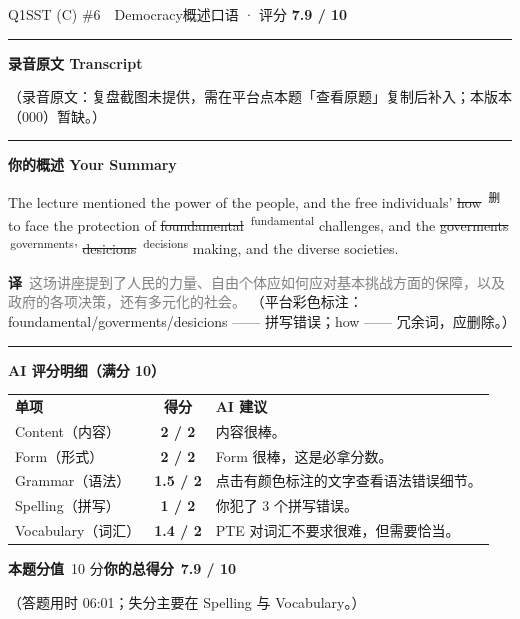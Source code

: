 \documentclass[11pt]{article}
\newcommand{\fix}[2]{%
  \colorbox{cWrongBg}{\textcolor{cWrong}{\sout{#1}}}%
  \,\textsuperscript{\textcolor{cFix}{\footnotesize #2}}}
\newcommand{\del}[1]{%
  \colorbox{cDelBg}{\textcolor{cDelete}{\sout{#1}}}%
  \,\textsuperscript{\textcolor{cDelete}{\footnotesize 删}}}
\newcommand{\sfull}[1]{\textcolor{cFix}{\bfseries #1}}     %
\newcommand{\spart}[1]{\textcolor{cPartial}{\bfseries #1}} %
\newcommand{\ptesub}[1]{%
  \par\needspace{2\baselineskip}\smallskip
  {\color{cAccent}\rule[-0.2ex]{3pt}{1.05em}}\hspace{6pt}%
  {\bfseries\color{cHead}#1}\par\nopagebreak\smallskip}
\newcommand{\zh}[1]{{\footnotesize\textcolor{cNote}{\textbf{译}}\ \textcolor{gray}{#1}}}
\begin{document}
\begin{qblock}{Q1\quad SST (C) \#6\ \ Democracy}{概述口语 · 评分 \textcolor{cAccent}{\bfseries 7.9 / 10}}
\ptesub{录音原文 Transcript}
\begin{promptbox}
{\color{cWrong}（录音原文：复盘截图未提供，需在平台点本题「查看原题」复制后补入；本版本（000）暂缺。）}
\end{promptbox}
\ptesub{你的概述 Your Summary}
\begin{youbox}
The lecture mentioned the power of the people, and the free individuals' \del{how} to face the protection of \fix{foundamental}{fundamental} challenges, and the \fix{goverments}{governments}' \fix{desicions}{decisions} making, and the diverse societies.
\end{youbox}
\zh{这场讲座提到了人民的力量、自由个体应如何应对基本挑战方面的保障，以及政府的各项决策，还有多元化的社会。}
{\footnotesize\color{gray}（平台彩色标注：foundamental/goverments/desicions —— 拼写错误；how —— 冗余词，应删除。）}
\ptesub{AI 评分明细（满分 10）}
\begin{notebox}
{\renewcommand{\arraystretch}{1.35}
\begin{tabularx}{\linewidth}{@{}l c Z@{}}
\textbf{单项} & \textbf{得分} & \textbf{AI 建议}\\[2pt]
Content（内容）& \sfull{2 / 2} & 内容很棒。\\
Form（形式）& \sfull{2 / 2} & Form 很棒，这是必拿分数。\\
Grammar（语法）& \spart{1.5 / 2} & 点击有颜色标注的文字查看语法错误细节。\\
Spelling（拼写）& \spart{1 / 2} & 你犯了 3 个拼写错误。\\
Vocabulary（词汇）& \spart{1.4 / 2} & PTE 对词汇不要求很难，但需要恰当。\\
\end{tabularx}}
\smallskip
\textbf{本题分值}\ 10 分\qquad\textbf{你的总得分}\ \textcolor{cAccent}{\bfseries 7.9 / 10}
\end{notebox}
\smallskip
{\footnotesize\color{gray}（答题用时 06:01；失分主要在 Spelling 与 Vocabulary。）}
\end{qblock}
\end{document}
